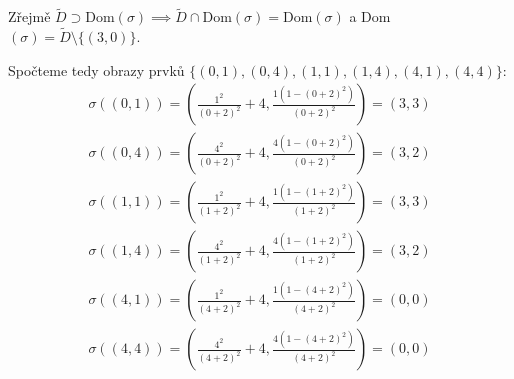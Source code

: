 \documentclass[12pt, a4paper]{article}
\begin{document}
Zřejmě $\tilde{D} \supset \text{Dom}(\sigma) \implies \tilde{D} \cap \text{Dom}(\sigma) = \text{Dom}(\sigma)$ a Dom$(\sigma) = \tilde{D}\setminus \{(3,0)\}$. 

Spočteme tedy obrazy prvků $\{(0,1),(0,4),(1,1),(1,4),(4,1),(4,4)\}$:
\begin{gather*}
\sigma((0,1)) = \left(\frac{1^2}{(0+2)^2}+4,\frac{1(1-(0+2)^2)}{(0+2)^2}\right) = (3, 3)\\
\sigma((0,4)) = \left(\frac{4^2}{(0+2)^2}+4,\frac{4(1-(0+2)^2)}{(0+2)^2}\right) = (3, 2)\\
\sigma((1,1)) = \left(\frac{1^2}{(1+2)^2}+4,\frac{1(1-(1+2)^2)}{(1+2)^2}\right) = (3, 3)\\
\sigma((1,4)) = \left(\frac{4^2}{(1+2)^2}+4,\frac{4(1-(1+2)^2)}{(1+2)^2}\right) = (3, 2)\\
\sigma((4,1)) = \left(\frac{1^2}{(4+2)^2}+4,\frac{1(1-(4+2)^2)}{(4+2)^2}\right) = (0, 0)\\
\sigma((4,4)) = \left(\frac{4^2}{(4+2)^2}+4,\frac{4(1-(4+2)^2)}{(4+2)^2}\right) = (0, 0)\\
\end{gather*}
\end{document}
